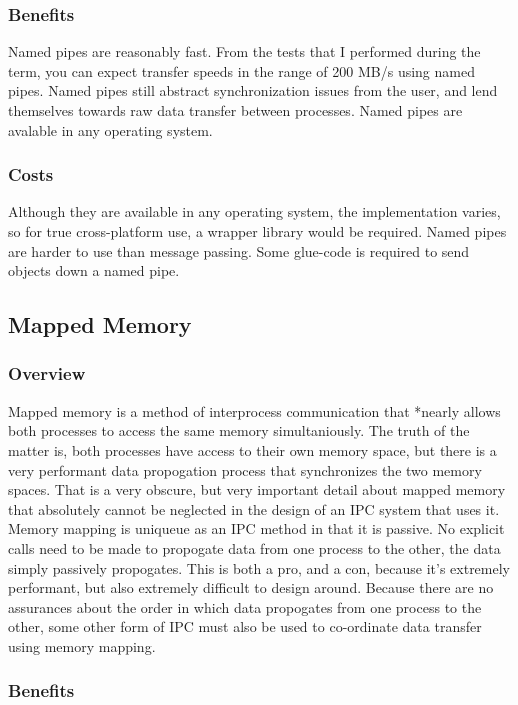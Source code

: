 \documentclass[se]{uw-wkrpt}
\begin{document}
\subsubsection{Benefits}

Named pipes are reasonably fast. From the tests that I performed during the term, you can 
expect transfer speeds in the range of 200 MB/s using named pipes. Named pipes still abstract
synchronization issues from the user, and lend themselves towards raw data transfer between
processes. Named pipes are avalable in any operating system.

\subsubsection{Costs}

Although they are available in any operating system, the implementation varies, so for true
cross-platform use, a wrapper library would be required. Named pipes are harder to use
than message passing. Some glue-code is required to send objects down a named pipe.

\subsection{Mapped Memory}

\subsubsection{Overview}

Mapped memory is a method of interprocess communication that *nearly allows both processes to access
the same memory simultaniously. The truth of the matter is, both processes have access to their own
memory space, but there is a very performant data propogation process that synchronizes the two memory
spaces. That is a very obscure, but very important detail about mapped memory that absolutely cannot be
neglected in the design of an IPC system that uses it. Memory mapping is uniqueue as an IPC method in that
it is passive. No explicit calls need to be made to propogate data from one process to the other, the data
simply passively propogates. This is both a pro, and a con, because it's extremely performant, but also 
extremely difficult to design around. Because there are no assurances about the order in which data propogates
from one process to the other, some other form of IPC must also be used to co-ordinate data transfer using
memory mapping.

\subsubsection{Benefits}
\end{document}
